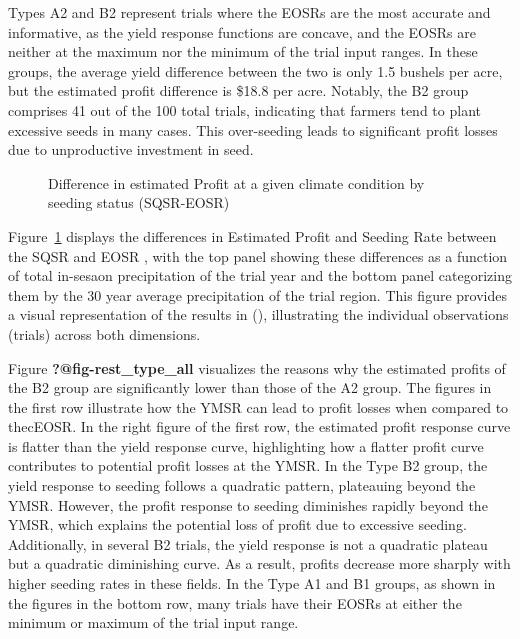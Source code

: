 \documentclass[
]{article}
\begin{document}
Types A2 and B2 represent trials where the EOSRs are the most accurate
and informative, as the yield response functions are concave, and the
EOSRs are neither at the maximum nor the minimum of the trial input
ranges. In these groups, the average yield difference between the two is
only 1.5 bushels per acre, but the estimated profit difference is \$18.8
per acre. Notably, the B2 group comprises 41 out of the 100 total
trials, indicating that farmers tend to plant excessive seeds in many
cases. This over-seeding leads to significant profit losses due to
unproductive investment in seed.

\begin{figure}


\caption{\label{fig-dif_pro_seed_comb}Difference in estimated Profit at
a given climate condition by seeding status (SQSR-EOSR)}

\end{figure}%

Figure~\ref{fig-dif_pro_seed_comb} displays the differences in Estimated
Profit and Seeding Rate between the SQSR and EOSR , with the top panel
showing these differences as a function of total in-sesaon precipitation
of the trial year and the bottom panel categorizing them by the 30 year
average precipitation of the trial region. This figure provides a visual
representation of the results in
(),
illustrating the individual observations (trials) across both
dimensions.

Figure \textbf{?@fig-rest\_type\_all} visualizes the reasons why the
estimated profits of the B2 group are significantly lower than those of
the A2 group. The figures in the first row illustrate how the YMSR can
lead to profit losses when compared to thecEOSR. In the right figure of
the first row, the estimated profit response curve is flatter than the
yield response curve, highlighting how a flatter profit curve
contributes to potential profit losses at the YMSR. In the Type B2
group, the yield response to seeding follows a quadratic pattern,
plateauing beyond the YMSR. However, the profit response to seeding
diminishes rapidly beyond the YMSR, which explains the potential loss of
profit due to excessive seeding. Additionally, in several B2 trials, the
yield response is not a quadratic plateau but a quadratic diminishing
curve. As a result, profits decrease more sharply with higher seeding
rates in these fields. In the Type A1 and B1 groups, as shown in the
figures in the bottom row, many trials have their EOSRs at either the
minimum or maximum of the trial input range.
\end{document}

